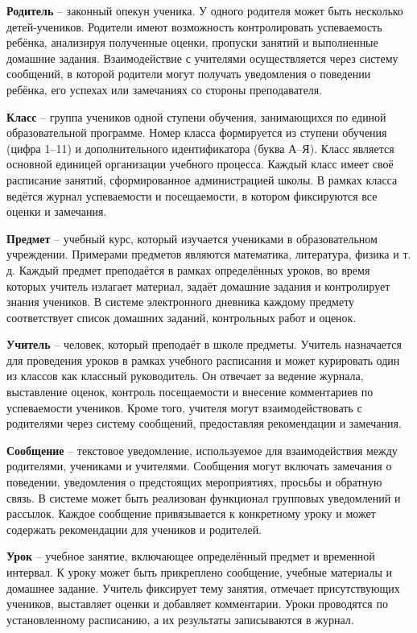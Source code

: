 \documentclass[a4paper, final]{article}
\begin{document}
\textbf{Родитель} -- законный опекун ученика. У одного родителя может быть несколько детей-учеников. Родители имеют возможность контролировать успеваемость ребёнка, анализируя полученные оценки, пропуски занятий и выполненные домашние задания. Взаимодействие с учителями осуществляется через систему сообщений, в которой родители могут получать уведомления о поведении ребёнка, его успехах или замечаниях со стороны преподавателя.

\textbf{Класс} -- группа учеников одной ступени обучения, занимающихся по единой образовательной программе. Номер класса формируется из ступени обучения (цифра 1--11) и дополнительного идентификатора (буква А--Я). Класс является основной единицей организации учебного процесса. Каждый класс имеет своё расписание занятий, сформированное администрацией школы. В рамках класса ведётся журнал успеваемости и посещаемости, в котором фиксируются все оценки и замечания.

\textbf{Предмет} -- учебный курс, который изучается учениками в образовательном учреждении. Примерами предметов являются математика, литература, физика и т. д. Каждый предмет преподаётся в рамках определённых уроков, во время которых учитель излагает материал, задаёт домашние задания и контролирует знания учеников. В системе электронного дневника каждому предмету соответствует список домашних заданий, контрольных работ и оценок.

\textbf{Учитель} -- человек, который преподаёт в школе предметы. Учитель назначается для проведения уроков в рамках учебного расписания и может курировать один из классов как классный руководитель. Он отвечает за ведение журнала, выставление оценок, контроль посещаемости и внесение комментариев по успеваемости учеников. Кроме того, учителя могут взаимодействовать с родителями через систему сообщений, предоставляя рекомендации и замечания.

\textbf{Сообщение} -- текстовое уведомление, используемое для взаимодействия между родителями, учениками и учителями. Сообщения могут включать замечания о поведении, уведомления о предстоящих мероприятиях, просьбы и обратную связь. В системе может быть реализован функционал групповых уведомлений и рассылок. Каждое сообщение привязывается к конкретному уроку и может содержать рекомендации для учеников и родителей.

\textbf{Урок} -- учебное занятие, включающее определённый предмет и временной интервал. К уроку может быть прикреплено сообщение, учебные материалы и домашнее задание. Учитель фиксирует тему занятия, отмечает присутствующих учеников, выставляет оценки и добавляет комментарии. Уроки проводятся по установленному расписанию, а их результаты записываются в журнал.
\end{document}
